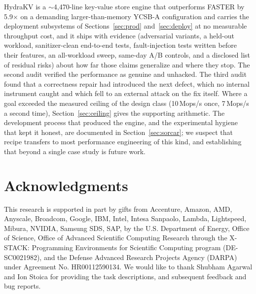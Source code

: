 \documentclass{article}
\newcommand{\SpeedupFinal}{5.9$\times$}
\newcommand{\EngineLocFinal}{$\sim$4{,}470}
\begin{document}
HydraKV is a \EngineLocFinal-line key-value store engine that outperforms FASTER by \SpeedupFinal{} on a demanding larger-than-memory YCSB-A configuration and carries the deployment subsystems of Sections~\ref{sec:prod} and~\ref{sec:deploy} at no measurable throughput cost, and it ships with evidence (adversarial variants, a held-out workload, sanitizer-clean end-to-end tests, fault-injection tests written before their features, an all-workload sweep, same-day A/B controls, and a disclosed list of residual risks) about how far those claims generalize and where they stop. The second audit verified the performance as genuine and unhacked. The third audit found that a correctness repair had introduced the next defect, which no internal instrument caught and which fell to an external attack on the fix itself. Where a goal exceeded the measured ceiling of the design class (10\,Mops/s once, 7\,Mops/s a second time), Section~\ref{sec:ceiling} gives the supporting arithmetic. The development process that produced the engine, and the experimental hygiene that kept it honest, are documented in Section~\ref{sec:sorcar}; we suspect that recipe transfers to most performance engineering of this kind, and establishing that beyond a single case study is future work.

\section*{Acknowledgments}
This research is supported in part by gifts from Accenture, Amazon, AMD, Anyscale, Broadcom, Google, IBM, Intel, Intesa Sanpaolo, Lambda, Lightspeed, Mibura, NVIDIA, Samsung SDS, SAP, by the U.S. Department of Energy, Office of Science, Office of Advanced Scientific Computing Research through the X-STACK: Programming Environments for Scientific Computing program (DE-SC0021982), and the Defense Advanced Research Projects Agency (DARPA) under Agreement No. HR00112590134.  We would like to thank Shubham Agarwal and Ion Stoica for providing the task descriptions, and subsequent feedback and bug reports.
\end{document}
